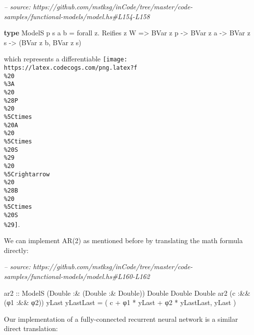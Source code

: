 \documentclass[]{article}
\newenvironment{Shaded}{}{}
\newcommand{\CommentTok}[1]{\textcolor[rgb]{0.38,0.63,0.69}{\textit{#1}}}
\newcommand{\DataTypeTok}[1]{\textcolor[rgb]{0.56,0.13,0.00}{#1}}
\newcommand{\FunctionTok}[1]{\textcolor[rgb]{0.02,0.16,0.49}{#1}}
\newcommand{\KeywordTok}[1]{\textcolor[rgb]{0.00,0.44,0.13}{\textbf{#1}}}
\newcommand{\NormalTok}[1]{#1}
\newcommand{\OtherTok}[1]{\textcolor[rgb]{0.00,0.44,0.13}{#1}}
\begin{document}
\begin{Shaded}
\begin{Highlighting}[]
\CommentTok{-- source: https://github.com/mstksg/inCode/tree/master/code-samples/functional-models/model.hs#L154-L158}

\KeywordTok{type} \DataTypeTok{ModelS}\NormalTok{ p s a b }\FunctionTok{=}\NormalTok{ forall z}\FunctionTok{.} \DataTypeTok{Reifies}\NormalTok{ z }\DataTypeTok{W}
                   \OtherTok{=>} \DataTypeTok{BVar}\NormalTok{ z p}
                   \OtherTok{->} \DataTypeTok{BVar}\NormalTok{ z a}
                   \OtherTok{->} \DataTypeTok{BVar}\NormalTok{ z s}
                   \OtherTok{->}\NormalTok{ (}\DataTypeTok{BVar}\NormalTok{ z b, }\DataTypeTok{BVar}\NormalTok{ z s)}
\end{Highlighting}
\end{Shaded}

which represents a differentiable
\texttt{[image: https://latex.codecogs.com/png.latex?f\\\%20\\\%3A\\\%20\\\%28P\\\%20\\\%5Ctimes\\\%20A\\\%20\\\%5Ctimes\\\%20S\\\%29\\\%20\\\%5Crightarrow\\\%20\\\%28B\\\%20\\\%5Ctimes\\\%20S\\\%29]}.

We can implement AR(2) as mentioned before by translating the math formula
directly:

\begin{Shaded}
\begin{Highlighting}[]
\CommentTok{-- source: https://github.com/mstksg/inCode/tree/master/code-samples/functional-models/model.hs#L160-L162}

\OtherTok{ar2 ::} \DataTypeTok{ModelS}\NormalTok{ (}\DataTypeTok{Double} \FunctionTok{:&}\NormalTok{ (}\DataTypeTok{Double} \FunctionTok{:&} \DataTypeTok{Double}\NormalTok{)) }\DataTypeTok{Double} \DataTypeTok{Double} \DataTypeTok{Double}
\NormalTok{ar2 (c }\FunctionTok{:&&}\NormalTok{ (φ1 }\FunctionTok{:&&}\NormalTok{ φ2)) yLast yLastLast }\FunctionTok{=}
\NormalTok{    ( c }\FunctionTok{+}\NormalTok{ φ1 }\FunctionTok{*}\NormalTok{ yLast }\FunctionTok{+}\NormalTok{ φ2 }\FunctionTok{*}\NormalTok{ yLastLast, yLast )}
\end{Highlighting}
\end{Shaded}

Our implementation of a fully-connected recurrent neural network is a similar
direct translation:
\end{document}
